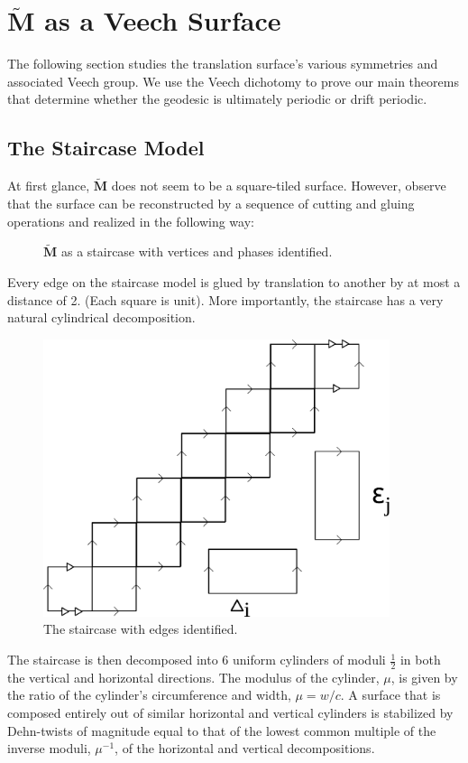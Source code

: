 \documentclass[]{article}
\begin{document}
\newpage

\section{$\tilde{\mathbf{M}}$ as a Veech Surface}
The following section studies the translation surface's various symmetries and associated Veech group. We use the Veech dichotomy to prove our main theorems that determine whether the geodesic is ultimately periodic or drift periodic.

\subsection{The Staircase Model}
At first glance, $\tilde{\mathbf{M}}$ does not seem to be a square-tiled surface. However, observe that the surface can be reconstructed by a sequence of cutting and gluing operations and realized in the following way:

\begin{figure}[H]
\centering

\caption{$\tilde{\mathbf{M}}$ as a staircase with vertices and phases identified.}
\end{figure}

Every edge on the staircase model is glued by translation to another by at most a distance of 2. (Each square is unit). More importantly, the staircase has a very natural cylindrical decomposition.

\begin{figure}[H]
\centering
\includegraphics[width=4in]{cylinderdecomp.pdf}
\caption{The staircase with edges identified.}
\end{figure}

The staircase is then decomposed into 6 uniform cylinders of moduli $\frac{1}{2}$ in both the vertical and horizontal directions. The modulus of the cylinder, $\mu$, is given by the ratio of the cylinder's circumference and width, $\mu{}={}w/c$. A surface that is composed entirely out of similar horizontal and vertical cylinders is stabilized by Dehn-twists of magnitude equal to that of the lowest common multiple of the inverse moduli, $\mu^{-1}$, of the horizontal and vertical decompositions.
\end{document}
